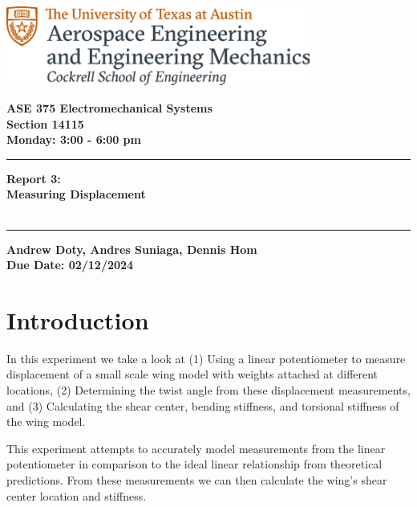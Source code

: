 \documentclass{article}
\begin{document}
\begin{titlepage}
  \centering
  \includegraphics[width=10cm]{ase-logo-formal.png}  %
  \vspace{1cm}  %
 
  \Large \textbf{ASE 375 Electromechanical Systems}\\
  \large \textbf{Section 14115}\\
  \vspace{0.5cm}
  \textbf{Monday: 3:00 - 6:00 pm}\\
 
  \vspace{1cm}
 
  \hrule
  \vspace{0.5cm}
 
  \Huge \textbf{Report 3:\\
  Measuring Displacement}\\
  \Huge \textbf{}\\
 
  \vspace{0.5cm}
  \hrule
 
  \vspace{1cm}
 
  \normalsize \textbf{Andrew Doty, Andres Suniaga, Dennis Hom}\\
  \normalsize \textbf{Due Date: 02/12/2024}
 
\end{titlepage}
\newpage

\tableofcontents
\thispagestyle{empty}
\newpage

\section{Introduction}
In this experiment we take a look at (1) Using a linear potentiometer to measure displacement of a small scale wing model with weights attached at different locations, (2) Determining the twist angle from these displacement measurements, and (3) Calculating the shear center, bending stiffness, and torsional stiffness of the wing model. 

This experiment attempts to accurately model measurements from the linear potentiometer in comparison to the ideal linear relationship from theoretical predictions. From these measurements we can then calculate the wing's shear center location and stiffness.  
\end{document}
